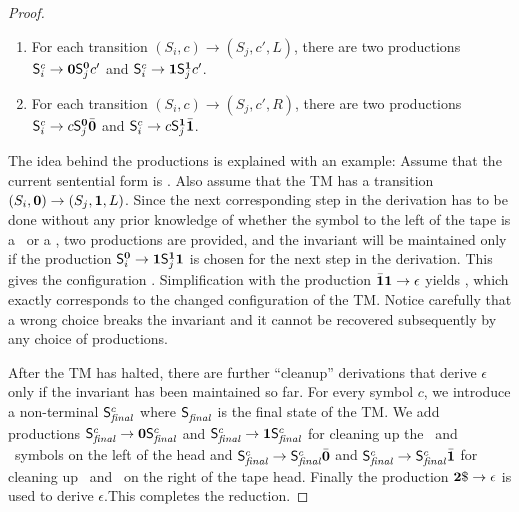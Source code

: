 \documentclass[preprint,9pt]{sigplanconf}
\begin{document}
\begin{proof}
\begin{enumerate}
\item For each transition  $(S_i, c) \rightarrow (S_j,c',L)$, there are
  two  productions $\mathsf{S}_{i}^{c}  \rightarrow  \mathbf{0} \mathsf{S}_{j}^{\mathbf{0}}c'$
  and $\mathsf{S}_{i}^{c} \rightarrow \mathbf{1} \mathsf{S}_{j}^{\mathbf{1}}c'$.
\item For each  transition $(S_i, c) \rightarrow (S_j,c',R)$, there
  are two productions
  $\mathsf{S}_{i}^{c} \rightarrow c \mathsf{S}_{j}^{\mathbf{0}}\bar{\mathbf{0}}$ and $\mathsf{S}_{i}^{c}
  \rightarrow c \mathsf{S}_{j}^{\mathbf{1}}\bar{\mathbf{1}}$. 
\end{enumerate}
The idea  behind the  productions is explained  with an
example:  Assume that  the current  sentential form  is
\bcar\bcdr{}\acar\acar. Also  assume that  the
TM  has  a   transition  $(S_i,\mathbf{0})  \rightarrow
(S_j,\mathbf{1}, L)$.  Since the next corresponding  step in
the  derivation  has  to  be  done  without  any  prior
knowledge of whether the symbol to the left of the tape
is a \acar\  or a \acdr, two  productions are provided,
and  the  invariant  will  be maintained  only  if  the
production         $\mathsf{S}_{i}^{\mathbf{0}}         \rightarrow
\mathbf{1}\mathsf{S}_{j}^{\mathbf{1}}\mathbf{1}$ is chosen  for the next step
in  the  derivation.    This  gives  the  configuration
\bcar\bcdr\acdr{}\acdr\acar\acar.
Simplification   with    the   production   $\bar{\mathbf{1}}\mathbf{1}
\rightarrow               \epsilon$              yields
\bcar{}\acdr\acar\acar,    which   exactly
corresponds  to   the  changed  configuration   of  the
TM.  Notice  carefully that a wrong  choice breaks
the invariant  and it cannot be  recovered subsequently
by any choice of productions.

After the  TM has  halted, there  are further  ``cleanup'' derivations
that derive  $\epsilon$ only if  the invariant has been  maintained so
far.    For   every   symbol   $c$,  we   introduce   a   non-terminal
$\mathsf{S}_{\mathit{final}}^{c}$  where   $\mathsf{S}_{\mathit{final}}^{}$  is  the
final state  of the  TM. We add  productions $\mathsf{S}_{\mathit{final}}^{c}
\rightarrow         \mathbf{0}        \mathsf{S}_{\mathit{final}}^{c}$         and
$\mathsf{S}_{\mathit{final}}^{c} \rightarrow  \mathbf{1} \mathsf{S}_{\mathit{final}}^{c}$
for cleaning up the \bcar\ and \bcdr\  symbols on the left of the head
and                $\mathsf{S}_{\mathit{final}}^{c}               \rightarrow
\mathsf{S}_{\mathit{final}}^{c}\bar{\mathbf{0}}$      and      $\mathsf{S}_{\mathit{final}}^{c}
\rightarrow \mathsf{S}_{\mathit{final}}^{c}\bar{\mathbf{1}}$ for  cleaning up \acar\ and
\acdr\ on the right of the tape head. Finally the production ${\mathbf{2}}\$
\rightarrow \epsilon$ is used  to derive $\epsilon$.This completes the
reduction.
\end{proof}
\end{document}
